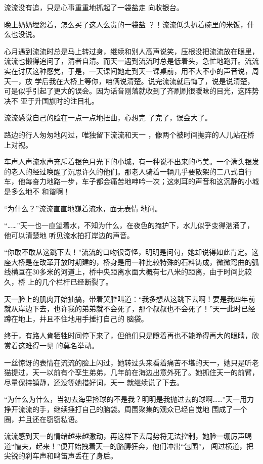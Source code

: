 \documentclass{article}
\begin{document}
流流没有追，只是心事重重地抓起了一袋盐走
向收银台。 

晚上奶奶埋怨着，怎么买了这人么贵的一袋盐
？！流流低头扒着碗里的米饭，什么也没说。 

心月遇到流流时总是马上转过身，继续和别人高声说笑，压根没把流流放在眼里，流流也懒得追问了，清者自清。而天一遇到流流时总是低着头，急忙地跑开。流流实在讨厌这种感党，于是，一天课间她走到天一课桌前，用不大不小的声音说，周天一，放
\newpage
学后我在大桥上等你，咱俩说清楚。说完流流就后悔了，说是说清楚，可是似乎引起了更大的误会。因为话音刚落就收到了齐刷刷很暧昧的目光，这阵势决不
亚于升国旗时的注目礼。 

流流感觉自己的脸在一点一点地扭曲，心想完
了完了，误会大了。 

路边的行人匆匆地闪过，唯独留下流流和天一
，像两个被时间抛弃的人儿站在桥上对视。 

车声人声流水声充斥着银色月光下的小城，有一种说不出来的丐美。一个满头银发的老人的经过唤醒了沉思许久的他们。那老人骑着一辆几乎要散架的二八式自行车，他每奋力地路一步，车子都会痛苦地呻吟一次；这刺耳的声音和这沉静的小城是多么地不
和谐啊！ 

“为什么？”流流直直地巍着流水，面无表情
地问。 

\newpage

“……”天一也一直望着水，不知为什么，在夜色的掩护下，水儿似乎变得汹涌了，他可以清楚地
听见流水拍打岸边的声音。 

“你敢不敢从这跳下去！”流流的口吻很奇怪，明明是问句，她却说得如此肯定。这座大桥是在改革开放时期建的，桥身是用一种比较特殊的石料铸成，微微弯曲的弧线横亘在30多米的河道上，桥中央距离水面大概有七八米的距离，由于时间比较久，桥
上的几个栏杆已经断裂了。 

天一脸上的肌肉开始抽搞，带着哭腔叫道：“我多想从这跳下去啊！要是我四年前就从岸边下去，也许我的弟弟就不会死了，那个叔叔也不会死了！”天一此时已经蹲在地上，并且不住地用手捶打自己的
脑袋。 

终于，有路人肯牺牲时间停下来了，但他们只是瞪着再也不能睁得再大的眼睛，欣赏着这难得一见
的莫名举动。 

\newpage

一丝惊讶的表情在流流的脸上闪过，她转过头来看着痛苦不堪的天一，她只是听老猫提过，天一以前有个孪生弟弟，几年前在海边出意外死了。她抓住天一的前臂，尽量保持镇静，还没等她措好词，天一
就继续说了下去。 

“为什么为什么，当初去海里捡球的不是我？明明是我抛过去的球啊……”天一用力挣开流流的手，继续捶打自己的脑袋。周围聚集的观众已经自觉地
围成了一个圈，并且还在窃窃私语。 

流流感到天一的情绪越来越激动，再这样下去局势将无法控制，她脸一绷厉声喝道“懦夫，起来！”便开始拽着天一的胳膊狂奔，他们冲出“包围”，
闯过横道，把尖锐的刹车声和鸣笛声丢在了身后。 
\end{document}
